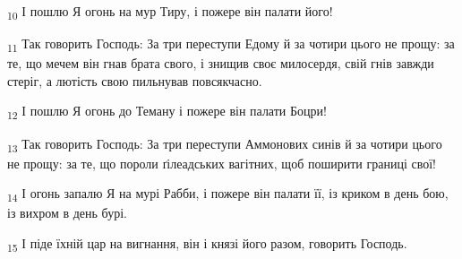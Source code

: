 \begin{tcolorbox}
\textsubscript{10} І пошлю Я огонь на мур Тиру, і пожере він палати його!
\end{tcolorbox}
\begin{tcolorbox}
\textsubscript{11} Так говорить Господь: За три переступи Едому й за чотири цього не прощу: за те, що мечем він гнав брата свого, і знищив своє милосердя, свій гнів завжди стеріг, а лютість свою пильнував повсякчасно.
\end{tcolorbox}
\begin{tcolorbox}
\textsubscript{12} І пошлю Я огонь до Теману і пожере він палати Боцри!
\end{tcolorbox}
\begin{tcolorbox}
\textsubscript{13} Так говорить Господь: За три переступи Аммонових синів й за чотири цього не прощу: за те, що пороли ґілеадських вагітних, щоб поширити границі свої!
\end{tcolorbox}
\begin{tcolorbox}
\textsubscript{14} І огонь запалю Я на мурі Рабби, і пожере він палати її, із криком в день бою, із вихром в день бурі.
\end{tcolorbox}
\begin{tcolorbox}
\textsubscript{15} І піде їхній цар на вигнання, він і князі його разом, говорить Господь.
\end{tcolorbox}
